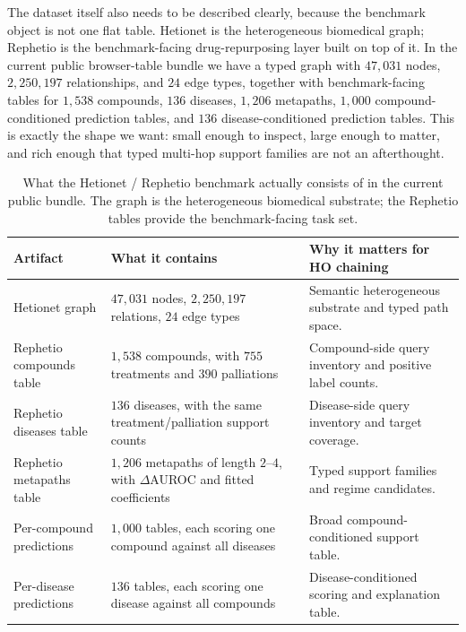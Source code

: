 \documentclass[11pt,openany]{report}
\begin{document}
The dataset itself also needs to be described clearly, because the
benchmark object is not one flat table.  Hetionet is the heterogeneous
biomedical graph; Rephetio is the benchmark-facing drug-repurposing
layer built on top of it.  In the current public browser-table bundle we
have a typed graph with $47{,}031$ nodes, $2{,}250{,}197$ relationships,
and $24$ edge types, together with benchmark-facing tables for $1{,}538$
compounds, $136$ diseases, $1{,}206$ metapaths, $1{,}000$
compound-conditioned prediction tables, and $136$
disease-conditioned prediction tables.\cite{Himmelstein2017Rephetio,DhimmelHetioRepData}
This is exactly the shape we want: small enough to inspect, large enough
to matter, and rich enough that typed multi-hop support families are not
an afterthought.

\begin{table}[ht]
\centering
\scriptsize
\renewcommand{\arraystretch}{1.02}
\begin{tabular}{@{}p{}p{}p{}@{}}
\toprule
Artifact & What it contains & Why it matters for HO chaining \\
\midrule
Hetionet graph &
$47{,}031$ nodes, $2{,}250{,}197$ relations, $24$ edge types &
Semantic heterogeneous substrate and typed path space. \\
Rephetio compounds table &
$1{,}538$ compounds, with $755$ treatments and $390$ palliations &
Compound-side query inventory and positive label counts. \\
Rephetio diseases table &
$136$ diseases, with the same treatment/palliation support counts &
Disease-side query inventory and target coverage. \\
Rephetio metapaths table &
$1{,}206$ metapaths of length $2$--$4$, with $\Delta$AUROC and fitted coefficients &
Typed support families and regime candidates. \\
Per-compound predictions &
$1{,}000$ tables, each scoring one compound against all diseases &
Broad compound-conditioned support table. \\
Per-disease predictions &
$136$ tables, each scoring one disease against all compounds &
Disease-conditioned scoring and explanation table. \\
\bottomrule
\end{tabular}
\renewcommand{\arraystretch}{1}
\caption{What the Hetionet / Rephetio benchmark actually consists of in the current public bundle.  The graph is the heterogeneous biomedical substrate; the Rephetio tables provide the benchmark-facing task set.}
\label{tab:hetionet-dataset-table}
\end{table}
\end{document}
